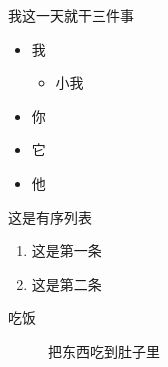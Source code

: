 \documentclass{ctexart}
\begin{document}
\large

{\heiti 我这一天就干三件事}
\begin{itemize}%
    \item 我
        \begin{itemize}
            \item 小我
        \end{itemize}
    \item 你
    \item 它
    \item 他
\end{itemize}
{\kaishu 这是有序列表}
\begin{enumerate} %
    \item 这是第一条
    \item 这是第二条
\end{enumerate}

\begin{description} %
    \item[吃饭] 把东西吃到肚子里
\end{description}
\end{document}

